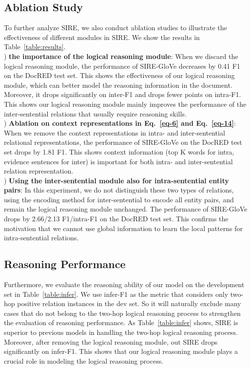 \documentclass[11pt,a4paper]{article}
\begin{document}
\subsection{Ablation Study\label{ssec:ablation}}

To further analyze SIRE, we also conduct ablation studies to illustrate the effectiveness of different modules in SIRE. We show the results in Table~\ref{table:results}. \\
) \textbf{the importance of the logical reasoning module}:
When we discard the logical reasoning module, the performance of SIRE-GloVe decreases by 0.41 F1 on the DocRED test set. This shows the effectiveness of our logical reasoning module, which can better model the reasoning information in the document. Moreover, it drops significantly on inter-F1 and drops fewer points on intra-F1. This shows our logical reasoning module mainly improves the performance of the inter-sentential relations that usually require reasoning skills. \\
) \textbf{Ablation on context representations in Eq.~\ref{eq-6} and Eq.~\ref{eq-14}}: When we remove the context representations in intra- and inter-sentential relational representations, the performance of SIRE-GloVe on the DocRED test set drops by 1.81 F1. This shows context information (top K words for intra, evidence sentences for inter) is important for both intra- and inter-sentential relation representation. \\
) \textbf{Using the inter-sentential module also for intra-sentential entity pairs}: In this experiment, we do not distinguish these two types of relations, using the encoding method for inter-sentential to encode all entity pairs, and remain the logical reasoning module unchanged. The performance of SIRE-GloVe drops by 2.66/2.13 F1/intra-F1 on the DocRED test set. This confirms the motivation that we cannot use global information to learn the local patterns for intra-sentential relations. 


\subsection{Reasoning Performance \label{ssec:qualitative}}
Furthermore, we evaluate the reasoning ability of our model on the development set in Table~\ref{table:infer}. We use infer-F1 as the metric that considers only two-hop positive relation instances in the dev set. So it will naturally exclude many cases that do not belong to the two-hop logical reasoning process to strengthen the evaluation of reasoning performance. As Table~\ref{table:infer} shows, SIRE is superior to previous models in handling the two-hop logical reasoning process. Moreover, after removing the logical reasoning module, out SIRE drops significantly on infer-F1. This shows that our logical reasoning module plays a crucial role in modeling the logical reasoning process.
\end{document}
